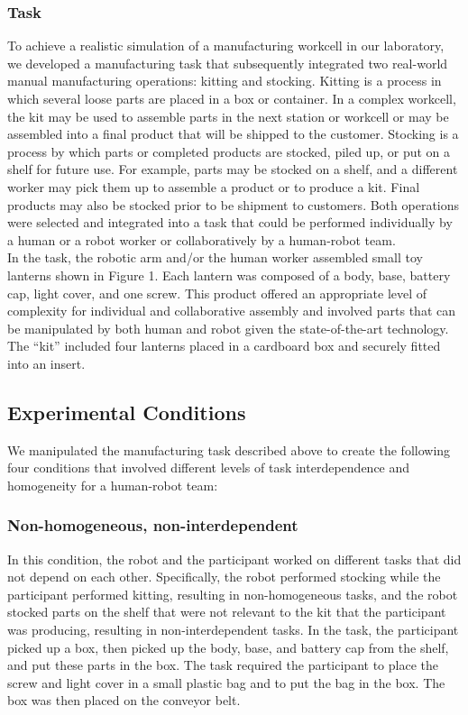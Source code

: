 \subsubsection{Task}
       To achieve a realistic simulation of a manufacturing workcell in our laboratory, we developed a manufacturing task that subsequently integrated two real-world manual manufacturing operations: kitting and stocking. Kitting is a process in which several loose parts are placed in a box or container. In a complex workcell, the kit may be used to assemble parts in the next station or workcell  or may be assembled into a final product that will be shipped to the customer.  Stocking is a process by which parts or completed products are stocked, piled up, or put on a shelf for future use. For example, parts may be stocked on a shelf, and a different  worker may pick them up to assemble a product or to produce a kit. Final products may also be stocked prior to be shipment to customers. Both operations were selected and integrated into a task that could be performed individually by a human or a robot worker or collaboratively by a human-robot team.\\
       In the task, the robotic arm and/or the human worker assembled small toy lanterns shown in Figure 1. Each lantern was composed of a body, base, battery cap, light cover, and one screw. This product offered an appropriate level of complexity for individual and collaborative assembly and involved parts that can be manipulated by both human and robot given the state-of-the-art technology.  The “kit” included four lanterns placed in a cardboard box and securely fitted into an insert.
\subsection{Experimental Conditions}
      We manipulated  the manufacturing task described above to create the following four conditions that involved different levels of task interdependence and homogeneity for a human-robot team:
\subsubsection{Non-homogeneous, non-interdependent} In this condition, the robot and the participant worked on different tasks that did not depend on each other.  Specifically, the robot performed stocking while the participant performed kitting, resulting in non-homogeneous tasks, and the robot stocked parts on the shelf that were not relevant to the kit that the participant was producing, resulting in non-interdependent tasks. In the task, the participant picked up a box, then picked up the body, base, and battery cap from the shelf, and put these parts in the box. The task required the participant to place the screw and light cover in a small plastic bag and to put the bag in the box. The box was then placed on the conveyor belt.
